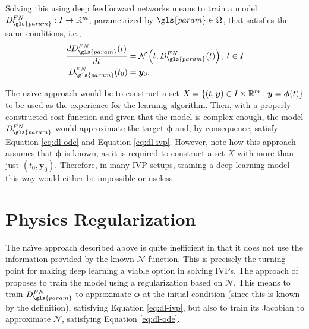 Solving this using deep feedforward networks means to train a model $D^{FN}_{\gls{param}}:I\to \R^{m}$, parametrized by $\gls{param}\in \Omega$, that satisfies the same conditions, i.e.,
\begin{align}
    \frac{d D^{FN}_{\gls{param}}(t)}{d t} &= \mathcal{N}\left( t, D^{FN}_{\gls{param}}(t) \right),\,t\in I \label{eq:dl-ode} \\
    D^{FN}_{\gls{param}}(t_0) &= \bm{y}_0 \label{eq:dl-ivp}
.\end{align}

The naïve approach would be to construct a set $X=\left\{ (t,\bm{y})\in I\times \mathbb{R}^{m}: \bm{y}=\bm{\phi}(t) \right\} $ to be used as the experience for the learning algorithm.
Then, with a properly constructed cost function and given that the model is complex enough, the model $D^{FN}_{\gls{param}}$ would approximate the target $\bm{\phi}$ and, by consequence, satisfy Equation \eqref{eq:dl-ode} and Equation \eqref{eq:dl-ivp}.
However, note how this approach assumes that $\bm{\phi}$ is known, as it is required to construct a set $X$ with more than just $\left( t_0,\bm{y}_0 \right) $.
Therefore, in many \gls{IVP} setups, training a deep learning model this way would either be impossible or useless.

\section{Physics Regularization}\label{sec:PI}

The naïve approach described above is quite inefficient in that it does not use the information provided by the known $\mathcal{N}$ function.
This is precisely the turning point for making deep learning a viable option in solving \gls{IVP}s.
The approach of \textcite{Raissi2019} proposes to train the model using a regularization based on $\mathcal{N}$.
This means to train $D^{FN}_{\gls{param}}$ to approximate $\bm{\phi}$ at the initial condition (since this is known by the definition), satisfying Equation \eqref{eq:dl-ivp}, but also to train its Jacobian to approximate $\mathcal{N}$, satisfying Equation \eqref{eq:dl-ode}.

